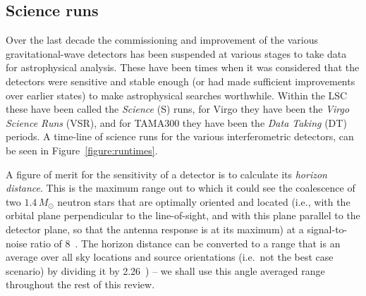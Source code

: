 \documentclass{article}
\begin{document}
\subsection{Science runs}
\label{subsection:runs}

Over the last decade the commissioning and improvement of the various
gravitational-wave detectors has been suspended at various stages to take data
for astrophysical analysis. These have been times when it was considered that
the detectors were sensitive and stable enough (or had made sufficient
improvements over earlier states) to make astrophysical searches worthwhile.
Within the LSC these have been called the \textit{Science} (S) runs, for Virgo they
have been the \textit{Virgo Science Runs} (VSR), and for TAMA300 they have been
the \textit{Data Taking} (DT) periods. A time-line of science runs for the various
interferometric detectors, can be seen in Figure~\ref{figure:runtimes}.


A figure of merit for the sensitivity of a detector is to calculate
its \textit{horizon distance}. This is the maximum range out to which
it could see the coalescence of two $1.4\,M_{\odot}$ neutron stars
that are optimally oriented and located (i.e., with the orbital plane
perpendicular to the line-of-sight, and with this plane parallel to
the detector plane, so that the antenna response is at its maximum) at
a signal-to-noise ratio of 8~\cite{Abbott:2005b}. The horizon distance
can be converted to a range that is an average over all sky locations
and source orientations (i.e.\, not the best case scenario) by dividing
it by 2.26~\cite{Sutton:2003}) -- we shall use this angle averaged
range throughout the rest of this review.
\end{document}
